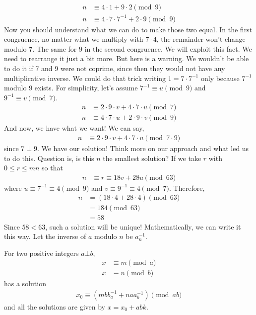 \documentclass{subfile}
\begin{document}
		\begin{align*}
			n & \equiv4\cdot1+9\cdot2\pmod{9}\\
			n & \equiv4\cdot7\cdot7^{-1}+2\cdot9\pmod{9}
		\end{align*}
	Now you should understand what we can do to make those two equal. In the first congruence, no matter what we multiply with $7\cdot4$, the remainder won't change modulo $7$. The same for $9$ in the second congruence. We will exploit this fact. We need to rearrange it just a bit more. But here is a warning. We wouldn't be able to do it if $7$ and $9$ were not coprime, since then they would not have any multiplicative inverse. We could do that trick writing $1=7\cdot7^{-1}$ only because $7^{-1}$ modulo $9$ exists. For simplicity, let's assume $7^{-1}\equiv u\pmod{9}$ and $9^{-1}\equiv v\pmod{7}$.
		\begin{align*}
			n & \equiv2\cdot9\cdot v+4\cdot7\cdot u\pmod{7}\\
			n & \equiv4\cdot7\cdot u+2\cdot9\cdot v\pmod{9}
		\end{align*}
	And now, we have what we want! We can say,
		\begin{align*}
			n & \equiv2\cdot9\cdot v+4\cdot7\cdot u\pmod{7\cdot9}
		\end{align*}
	since $7 \perp 9$. We have our solution! Think more on our approach and what led us to do this. Question is, is this $n$ the smallest solution? If we take $r$ with $0\leq r\leq mn$ so that
		\begin{align*}
			n & \equiv r\equiv18v+28u\pmod{63}
		\end{align*}
	where $u\equiv7^{-1}\equiv4\pmod9$ and $v\equiv9^{-1}\equiv4\pmod 7$. Therefore,
		\begin{align*}
			n
				& = (18\cdot4+28\cdot4)\pmod{63}\\
				& =184\pmod{63}\\
				& =58
		\end{align*}
	Since $58<63$, such a solution will be unique! Mathematically, we can write it this way. Let the inverse of $a$ modulo $n$ be $a^{-1}_n$.
		\begin{theorem}
			For two positive integers $a\bot b$,
				\begin{align*}
					x & \equiv m\pmod a\\
					x & \equiv n\pmod b
				\end{align*}
			has a solution
				\begin{align*}
					x_0 \equiv (mbb^{-1}_a+naa^{-1}_b)\pmod{ab}
				\end{align*}
			and all the solutions are given by $x=x_0+abk$.
		\end{theorem}
\end{document}
